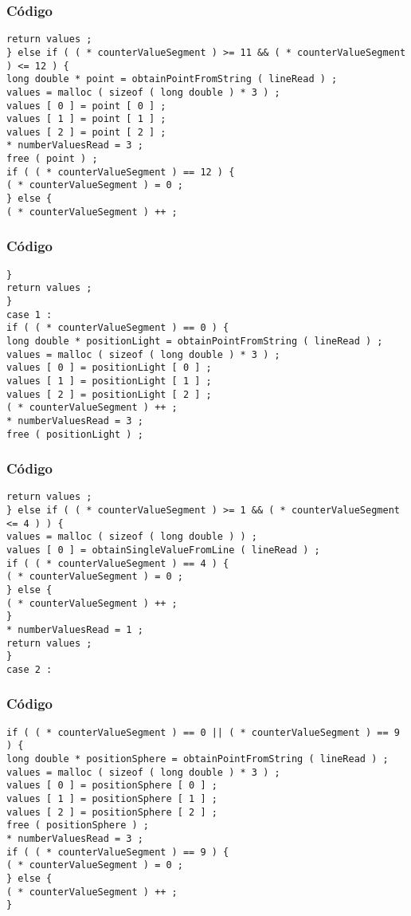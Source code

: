 \documentclass{beamer}
\begin{document}
\begin{frame}[fragile]
\frametitle{C\'odigo}
\begin{verbatim}
return values ; 
} else if ( ( * counterValueSegment ) >= 11 && ( * counterValueSegment ) <= 12 ) { 
long double * point = obtainPointFromString ( lineRead ) ; 
values = malloc ( sizeof ( long double ) * 3 ) ; 
values [ 0 ] = point [ 0 ] ; 
values [ 1 ] = point [ 1 ] ; 
values [ 2 ] = point [ 2 ] ; 
* numberValuesRead = 3 ; 
free ( point ) ; 
if ( ( * counterValueSegment ) == 12 ) { 
( * counterValueSegment ) = 0 ; 
} else { 
( * counterValueSegment ) ++ ; 
\end{verbatim}
\end{frame}
\begin{frame}[fragile]
\frametitle{C\'odigo}
\begin{verbatim}
} 
return values ; 
} 
case 1 : 
if ( ( * counterValueSegment ) == 0 ) { 
long double * positionLight = obtainPointFromString ( lineRead ) ; 
values = malloc ( sizeof ( long double ) * 3 ) ; 
values [ 0 ] = positionLight [ 0 ] ; 
values [ 1 ] = positionLight [ 1 ] ; 
values [ 2 ] = positionLight [ 2 ] ; 
( * counterValueSegment ) ++ ; 
* numberValuesRead = 3 ; 
free ( positionLight ) ; 
\end{verbatim}
\end{frame}
\begin{frame}[fragile]
\frametitle{C\'odigo}
\begin{verbatim}
return values ; 
} else if ( ( * counterValueSegment ) >= 1 && ( * counterValueSegment <= 4 ) ) { 
values = malloc ( sizeof ( long double ) ) ; 
values [ 0 ] = obtainSingleValueFromLine ( lineRead ) ; 
if ( ( * counterValueSegment ) == 4 ) { 
( * counterValueSegment ) = 0 ; 
} else { 
( * counterValueSegment ) ++ ; 
} 
* numberValuesRead = 1 ; 
return values ; 
} 
case 2 : 
\end{verbatim}
\end{frame}
\begin{frame}[fragile]
\frametitle{C\'odigo}
\begin{verbatim}
if ( ( * counterValueSegment ) == 0 || ( * counterValueSegment ) == 9 ) { 
long double * positionSphere = obtainPointFromString ( lineRead ) ; 
values = malloc ( sizeof ( long double ) * 3 ) ; 
values [ 0 ] = positionSphere [ 0 ] ; 
values [ 1 ] = positionSphere [ 1 ] ; 
values [ 2 ] = positionSphere [ 2 ] ; 
free ( positionSphere ) ; 
* numberValuesRead = 3 ; 
if ( ( * counterValueSegment ) == 9 ) { 
( * counterValueSegment ) = 0 ; 
} else { 
( * counterValueSegment ) ++ ; 
} 
\end{verbatim}
\end{frame}
\end{document}
